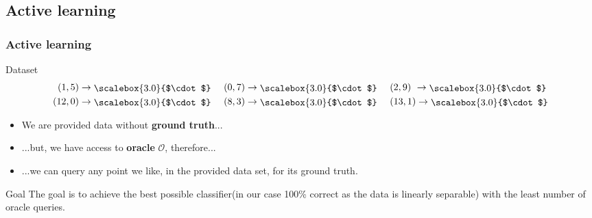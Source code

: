 \documentclass{beamer}
\newcommand*{\LargerCdot}{\raisebox{-0.25ex}{\scalebox{3.0}{$\cdot$}}}
\begin{document}
\subsection{Active learning}
  \begin{frame}
    \frametitle{Active learning}
    \begin{block}{Dataset}
      \begin{align*}
        (1,5)  & \rightarrow \textcolor{black}{\LargerCdot} \text{~~~~} (0,7)  \rightarrow \textcolor{black}{\LargerCdot} \text{~~~~} (2,9)  \text{~} \rightarrow \textcolor{black}{\LargerCdot}\\
        (12,0) & \rightarrow \textcolor{black}{\LargerCdot} \text{~~~~} (8,3)  \rightarrow \textcolor{black}{\LargerCdot} \text{~~~~} (13,1)  \rightarrow \textcolor{black}{\LargerCdot}
      \end{align*}
    \end{block}
    \begin{itemize}
      \item We are provided data without \textbf{ground truth}...
      \item ...but, we have access to \textbf{oracle} $\mathscr{O}$, therefore...
      \item ...we can query any point we like, in the provided data set, for its ground truth.
    \end{itemize}
    \begin{block}{Goal}
      The goal is to achieve the best possible classifier(in our case 100\% correct as the data is linearly separable) with the least number of oracle queries.
    \end{block}
  \end{frame}
\end{document}
